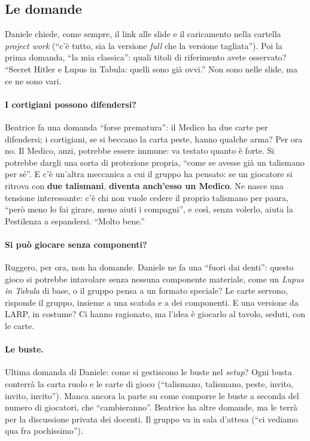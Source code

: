 \subsection{Le domande}

Daniele chiede, come sempre, il link alle slide e il caricamento nella cartella
\emph{project work} (``c'è tutto, sia la versione \emph{full} che la versione tagliata'').
Poi la prima domanda, ``la mia classica'': quali titoli di riferimento avete osservato?
``Secret Hitler e Lupus in Tabula: quelli sono già ovvi.'' Non sono nelle slide, ma ce
ne sono vari.

\paragraph{I cortigiani possono difendersi?} Beatrice fa una domanda ``forse prematura'':
il Medico ha due carte per difendersi; i cortigiani, se si beccano la carta peste, hanno
qualche arma? Per ora no. Il Medico, anzi, potrebbe essere immune: va testato quanto è
forte. Si potrebbe dargli una sorta di protezione propria, ``come se avesse già un
talismano per sé''. E c'è un'altra meccanica a cui il gruppo ha pensato: se un giocatore
si ritrova con \textbf{due talismani}, \textbf{diventa anch'esso un Medico}. Ne nasce una
tensione interessante: c'è chi non vuole cedere il proprio talismano per paura, ``però
meno lo fai girare, meno aiuti i compagni'', e così, senza volerlo, aiuta la Pestilenza
a espandersi. ``Molto bene.''

\paragraph{Si può giocare senza componenti?} Ruggero, per ora, non ha domande. Daniele
ne fa una ``fuori dai denti'': questo gioco si potrebbe intavolare senza nessuna
componente materiale, come un \emph{Lupus in Tabula} di base, o il gruppo pensa a un
formato speciale? Le carte servono, risponde il gruppo, insieme a una scatola e a dei
componenti. E una versione da LARP, in costume? Ci hanno ragionato, ma l'idea è giocarlo
al tavolo, seduti, con le carte.

\paragraph{Le buste.} Ultima domanda di Daniele: come si gestiscono le buste nel
\emph{setup}? Ogni busta conterrà la carta ruolo e le carte di gioco (``talismano,
talismano, peste, invito, invito, invito''). Manca ancora la parte su come comporre le
buste a seconda del numero di giocatori, che ``cambieranno''. Beatrice ha altre domande,
ma le terrà per la discussione privata dei docenti. Il gruppo va in sala d'attesa
(``ci vediamo qua fra pochissimo'').

